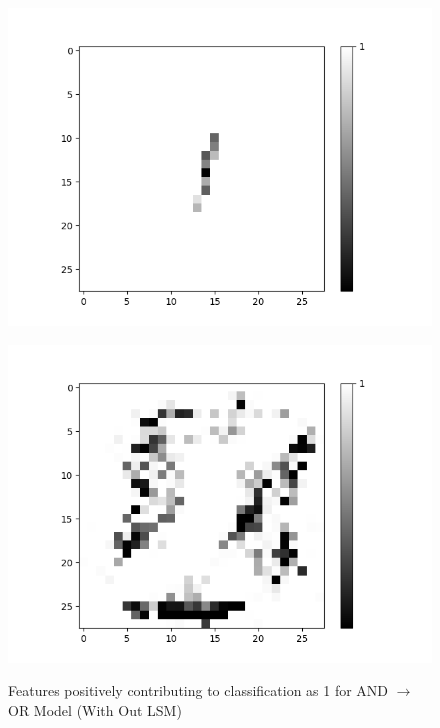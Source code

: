 \begin{minipage}[t]{0.5\textwidth}
	\begin{figure}[H]
			\centering
		\begin{minipage}[b]{0.5\textwidth}
			\captionsetup{labelformat=empty}
			\includegraphics[width=\textwidth]{AND-OR(WO-LSM)(1)/Like/True/Layer0-Neuron-3.png}
			\label{}
		\end{minipage}
		
		\medskip
		
		\begin{minipage}[b]{0.5\textwidth}
			\captionsetup{labelformat=empty}
			\includegraphics[width=\textwidth]{AND-OR(WO-LSM)(1)/Like/False/Layer0-Neuron-3.png}
			\label{}
		\end{minipage}
		\caption{Features positively contributing to classification as 1 for AND $\rightarrow$ OR Model (With Out LSM)}
		\label{fig:and-or-with-out-lsm-lnn-features-pos}
	\end{figure}
\end{minipage}

